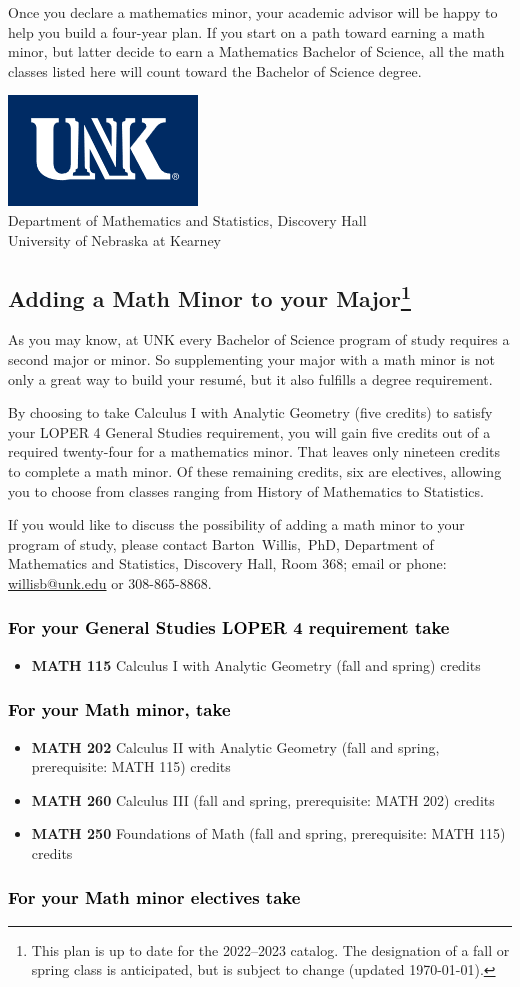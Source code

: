 \documentclass[10pt]{article}
\makeatletter
\newcommand{\calcone}{\textbf{MATH 115} Calculus I with Analytic Geometry (fall and spring) \dotfill 5 credits}
\newcommand{\calctwo}{\textbf{MATH 202} Calculus II with Analytic Geometry (fall and spring, prerequisite: MATH 115) \dotfill 5 credits }
\newcommand{\foundations}{\textbf{MATH 250} Foundations of Math (fall and spring, prerequisite: MATH 115)  \dotfill 3 credits}
\newcommand{\calcthree}{\textbf{MATH 260} Calculus III  (fall and spring, prerequisite: MATH 202) \dotfill 5 credits}
\newcommand{\contactbw}{\mbox{Barton Willis, PhD}, Department of Mathematics and Statistics,  Discovery Hall, Room 368;
email or phone: \href{mailto:willisb@unk.edu}{willisb@unk.edu} or 308-865-8868.}
\newcommand{\forinfo}[2]{If you would like to discuss the possibility of adding a math {#1} to your {#2}, please contact \contactbw}
\newcommand{\catalog}{2022--2023 }
\newcommand{\myfootnote}{\footnote{This plan is up to date for  the \catalog catalog. The designation of a fall or spring class is 
anticipated, but  is subject to change (updated  \today).}}
\newcommand{\myheading}{
\begin{flushleft}
\includegraphics[scale=0.35]{unk-logo}\\
\setcounter{footnote}{0}
\vspace{0.25in}
 \textcolor{unkblue}{Department of Mathematics and Statistics, Discovery Hall} \\
  \textcolor{unkblue}{University of Nebraska at Kearney}
\end{flushleft}}
\makeatother
\begin{document}
 \noindent Once you declare a mathematics minor, your academic advisor will be happy to help you build a four-year plan. If you start on a path toward earning a math minor, but latter decide to earn a  Mathematics Bachelor of Science, all the math classes listed here will count toward the Bachelor of Science degree.




\newpage

\myheading

\subsection*{\textbf{\textcolor{unkblue}{Adding a Math Minor to your Major\myfootnote}}}

As you may know, at UNK every Bachelor of Science program of study requires a second
major or minor. So supplementing your major with a math minor is not only a great
way to build your resum\'e, but it also fulfills a degree requirement.

By choosing to take Calculus I with Analytic Geometry (five credits) to satisfy
your LOPER 4 General Studies requirement, you will gain five credits out of a
required twenty-four for a mathematics minor. That leaves only nineteen credits
to complete a math minor.  Of these remaining credits, six are electives, allowing
you to choose from classes ranging from History of Mathematics to Statistics.


\forinfo{minor}{program of study}


\subsubsection*{\textcolor{black}{For your General Studies LOPER 4 requirement take}}
\begin{itemize}
\item \calcone
\end{itemize}


\subsubsection*{\textcolor{black}{For your Math minor, take}}
\begin{itemize}
  \item \calctwo
  \item \calcthree
\item \foundations
\end{itemize}

\subsubsection*{\textcolor{black}{For your Math minor electives take}}
\end{document}
